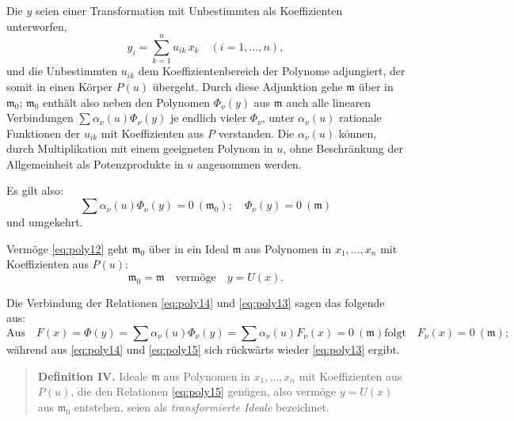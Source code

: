 \documentclass[fontsize=10pt,paper=a5,pagesize,headings=small]{scrbook}
\newcommand{\ideal}[1]{\mathfrak{#1}}
\theoremstyle{plain}
\begin{document}
Die $y$ seien einer Transformation mit Unbestimmten als Koeffizienten unterworfen,
\begin{equation}
\label{eq:poly12}
y_i = \sum_{k=1}^{n} u_{ik}\, x_k \quad (i=1,\dots,n),
\end{equation}
und die Unbestimmten $u_{ik}$ dem Koeffizientenbereich der Polynome adjungiert, der somit
in einen Körper $P(u)$ übergeht. Durch diese Adjunktion gehe $\ideal{m}$ über in $\ideal{m}_0$;
$\ideal{m}_0$ enthält also neben den Polynomen $\Phi_\nu(y)$ aus $\ideal{m}$ auch alle linearen Verbindungen
$\sum \alpha_\nu(u) \Phi_\nu(y)$ je endlich vieler $\Phi_\nu$, unter $\alpha_\nu(u)$ rationale Funktionen der
$u_{ik}$ mit Koeffizienten aus $P$ verstanden. Die $\alpha_\nu(u)$ können, durch Multiplikation
mit einem geeigneten Polynom in $u$, ohne Beschränkung der Allgemeinheit als Potenzprodukte
in $u$ angenommen werden.

Es gilt also:
\begin{equation}
\label{eq:poly13}
\sum \alpha_\nu(u) \Phi_\nu(y) = 0\ (\ideal{m}_0);\quad \Phi_\nu(y) = 0\ (\ideal{m})
\end{equation}
und umgekehrt.

Vermöge \eqref{eq:poly12} geht $\ideal{m}_0$ über in ein Ideal $\ideal{m}$ aus Polynomen in $x_1,\dots,x_n$
mit Koeffizienten aus $P(u)$:
\begin{equation}
\label{eq:poly14}
\ideal{m}_0 = \ideal{m} \quad \text{vermöge}\quad y = U(x).
\end{equation}

Die Verbindung der Relationen \eqref{eq:poly14} und \eqref{eq:poly13} sagen das folgende aus:
\begin{equation}
\label{eq:poly15}
\text{Aus}\quad F(x) = \Phi(y) = \sum \alpha_\nu(u) \Phi_\nu(y) = \sum \alpha_\nu(u) F_\nu(x) = 0\ (\ideal{m})
\text{folgt}\quad F_\nu(x) = 0\ (\ideal{m});
\end{equation}
während aus \eqref{eq:poly14} und \eqref{eq:poly15} sich rückwärts wieder \eqref{eq:poly13} ergibt.

\begin{quote}
\textbf{Definition IV.} Ideale $\ideal{m}$ aus Polynomen in $x_1,\dots,x_n$ mit Koeffizienten aus
$P(u)$, die den Relationen \eqref{eq:poly15} genügen, also vermöge $y = U(x)$ aus
$\ideal{m}_0$ entstehen, seien als \textit{transformierte Ideale} bezeichnet.
\end{quote}

\newpage
\setcounter{page}{432}
\end{document}
